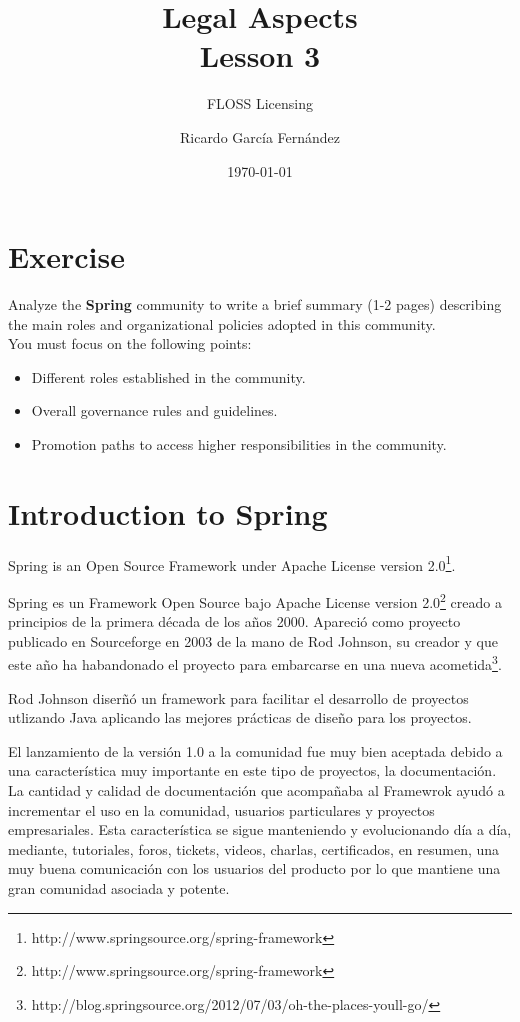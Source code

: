 \documentclass[11pt]{scrartcl}
\title{\textbf{Legal Aspects\\
				Lesson 3}}
\subtitle{FLOSS Licensing}
\author{Ricardo Garc\'ia Fern\'andez}
\date{\today}
\begin{document}
\maketitle

\section{Exercise}

Analyze the \textbf{Spring} community to write a brief summary (1-2 pages) describing the main roles and organizational policies adopted in this community.\\

You must focus on the following points:

\begin{itemize}

	\item Different roles established in the community.
	\item Overall governance rules and guidelines.
	\item Promotion paths to access higher responsibilities in the community.
\end{itemize}

\section{Introduction to Spring}

Spring is an Open Source Framework under Apache License version 2.0\footnote{http://www.springsource.org/spring-framework}.

Spring es un Framework Open Source bajo Apache License version 2.0\footnote{http://www.springsource.org/spring-framework} creado a principios de la primera década de los años 2000. Apareció como proyecto publicado en Sourceforge en 2003 de la mano de Rod Johnson, su creador y que este año ha habandonado el proyecto para embarcarse en una nueva acometida\footnote{http://blog.springsource.org/2012/07/03/oh-the-places-youll-go/}.

Rod Johnson diserñó un framework para facilitar el desarrollo de proyectos utlizando Java aplicando las mejores prácticas de diseño para los proyectos. 

El lanzamiento de la versión 1.0 a la comunidad fue muy bien aceptada debido a una característica muy importante en este tipo de proyectos, la documentación. La cantidad y calidad de documentación que acompañaba al Framewrok ayudó a incrementar el uso en la comunidad, usuarios particulares y proyectos empresariales.
Esta característica se sigue manteniendo y evolucionando día a día, mediante, tutoriales, foros, tickets, videos, charlas, certificados, en resumen, una muy buena comunicación con los usuarios del producto por lo que mantiene una gran comunidad asociada y potente.
\end{document}
